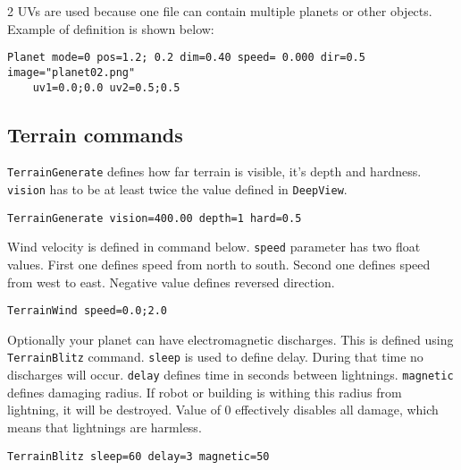 2 UVs are used because one file can contain multiple planets or other objects. Example of definition is shown below:

\begin{verbatim}
Planet mode=0 pos=1.2; 0.2 dim=0.40 speed= 0.000 dir=0.5 image="planet02.png"
    uv1=0.0;0.0 uv2=0.5;0.5
\end{verbatim}


\subsection{Terrain commands}

\texttt{TerrainGenerate} defines how far terrain is visible, it's depth and hardness. \texttt{vision} has to be at least twice the value defined in \texttt{DeepView}.

\begin{verbatim}
TerrainGenerate vision=400.00 depth=1 hard=0.5
\end{verbatim}

Wind velocity is defined in command below. \texttt{speed} parameter has two float values. First one defines speed from north to south. Second one defines speed from west to east. Negative value defines reversed direction.

\begin{verbatim}
TerrainWind speed=0.0;2.0
\end{verbatim}


Optionally your planet can have electromagnetic discharges. This is defined using \texttt{TerrainBlitz} command. \texttt{sleep} is used to define delay. During that time no discharges will occur. \texttt{delay} defines time in seconds between lightnings. \texttt{magnetic} defines damaging radius. If robot or building is withing this radius from lightning, it will be destroyed. Value of 0 effectively disables all damage, which means that lightnings are harmless.

\begin{verbatim}
TerrainBlitz sleep=60 delay=3 magnetic=50
\end{verbatim}

